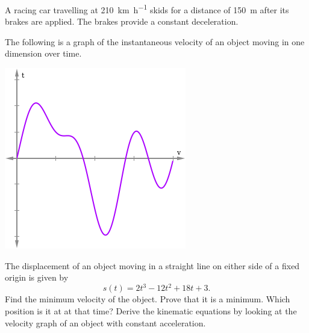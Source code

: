 \begin{questions}
  \questioA A racing car travelling at \SI{210}{\kilo\metre\per\hour} skids for a distance of \SI{150}{\metre}
            after its brakes are applied. The brakes provide a constant deceleration.
  \clearpage
  \questioM The following is a graph of the instantaneous velocity of an object moving in one dimension over time.
            \begin{center}
              \includegraphics[width=0.4\linewidth]{velocity2}
            \end{center}
  \questioE The displacement of an object moving in a straight line on either side of a fixed origin is given by
            \begin{displaymath}
              s(t) = 2t^3 - 12t^2 + 18t + 3.
            \end{displaymath}
            Find the minimum velocity of the object. Prove that it is a minimum. Which position is it at at that time?
  \questioM Derive the kinematic equations by looking at the velocity graph of an object with constant acceleration.
\end{questions}


